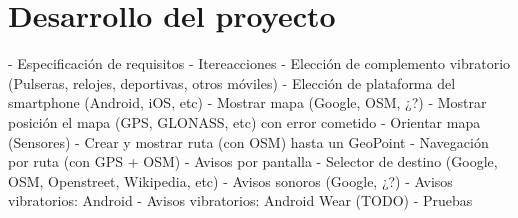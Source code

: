 \chapter{Desarrollo del proyecto}
\label{chap:desarrollo}

- Especificación de requisitos
- Itereacciones
    - Elección de complemento vibratorio (Pulseras, relojes, deportivas, otros móviles)
    - Elección de plataforma del smartphone (Android, iOS, etc)
    - Mostrar mapa (Google, OSM, ¿?)
    - Mostrar posición el mapa (GPS, GLONASS, etc) con error cometido
    - Orientar mapa (Sensores)
    - Crear y mostrar ruta (con OSM) hasta un GeoPoint
    - Navegación por ruta (con GPS + OSM)
    - Avisos por pantalla
    - Selector de destino (Google, OSM, Openstreet, Wikipedia, etc)
    - Avisos sonoros (Google, ¿?)
    - Avisos vibratorios: Android
    - Avisos vibratorios: Android Wear (TODO)
- Pruebas 

